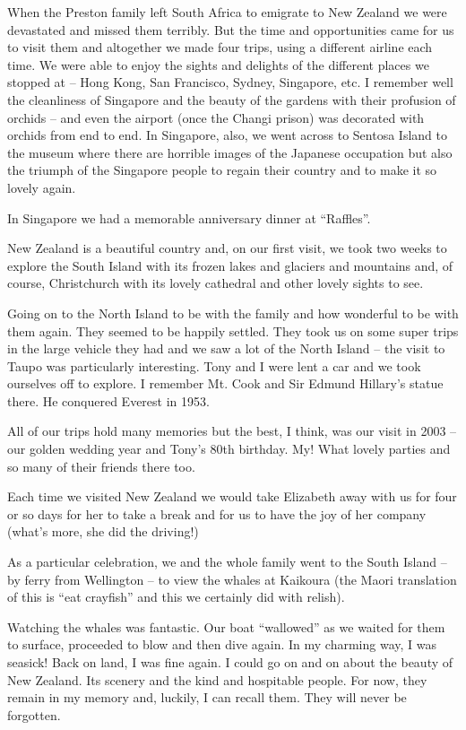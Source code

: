 When the Preston family left South Africa to emigrate to New Zealand
we were devastated and missed them terribly. But the time and
opportunities came for us to visit them and altogether we made four
trips, using a different airline each time. We were able to enjoy the
sights and delights of the different places we stopped at -- Hong
Kong, San Francisco, Sydney, Singapore, etc. I remember well the
cleanliness of Singapore and the beauty of the gardens with their
profusion of orchids -- and even the airport (once the Changi prison)
was decorated with orchids from end to end. In Singapore, also, we
went across to Sentosa Island to the museum where there are horrible
images of the Japanese occupation but also the triumph of the
Singapore people to regain their country and to make it so lovely
again.

In Singapore we had a memorable anniversary dinner at ``Raffles''.

New Zealand is a beautiful country and, on our first visit, we took
two weeks to explore the South Island with its frozen lakes and
glaciers and mountains and, of course, Christchurch with its lovely
cathedral and other lovely sights to see.

Going on to the North Island to be with the family and how wonderful
to be with them again. They seemed to be happily settled. They took us
on some super trips in the large vehicle they had and we saw a lot of
the North Island -- the visit to Taupo was particularly
interesting. Tony and I were lent a car and we took ourselves off to
explore. I remember Mt. Cook and Sir Edmund Hillary's statue there. He
conquered Everest in 1953.

All of our trips hold many memories but the best, I think, was our
visit in 2003 -- our golden wedding year and Tony's 80th birthday. My!
What lovely parties and so many of their friends there too.

Each time we visited New Zealand we would take Elizabeth away with us
for four or so days for her to take a break and for us to have the joy
of her company (what's more, she did the driving!)

As a particular celebration, we and the whole family went to the South
Island -- by ferry from Wellington -- to view the whales at Kaikoura
(the Maori translation of this is ``eat crayfish'' and this we
certainly did with relish).

Watching the whales was fantastic. Our boat ``wallowed'' as we waited
for them to surface, proceeded to blow and then dive again. In my
charming way, I was seasick! Back on land, I was fine again. I could
go on and on about the beauty of New Zealand. Its scenery and the kind
and hospitable people. For now, they remain in my memory and, luckily,
I can recall them. They will never be forgotten.

